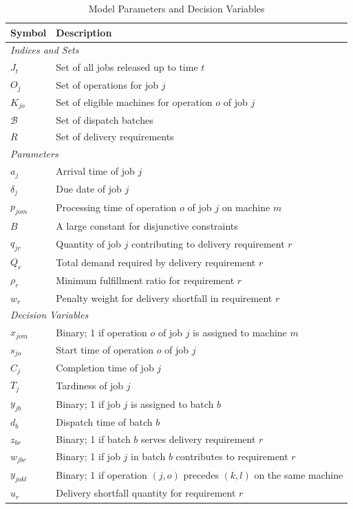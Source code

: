\documentclass{article}
\begin{document}
\vspace{-0.5\baselineskip}
\begin{table}[H]
\caption{Model Parameters and Decision Variables}
\begin{tabularx}{\textwidth}{lX}
\toprule
\textbf{Symbol} & \textbf{Description} \\
\midrule
\multicolumn{2}{l}{\textit{Indices and Sets}} \\
$J_t$ & Set of all jobs released up to time $t$ \\
$O_j$ & Set of operations for job $j$ \\
$K_{jo}$ & Set of eligible machines for operation $o$ of job $j$ \\
$\mathcal{B}$ & Set of dispatch batches \\
$R$ & Set of delivery requirements \\
\midrule
\multicolumn{2}{l}{\textit{Parameters}} \\
$a_j$ & Arrival time of job $j$ \\
$\delta_j$ & Due date of job $j$ \\
$p_{jom}$ & Processing time of operation $o$ of job $j$ on machine $m$ \\
$B$ & A large constant for disjunctive constraints \\
$q_{jr}$ & Quantity of job $j$ contributing to delivery requirement $r$ \\
$Q_r$ & Total demand required by delivery requirement $r$ \\
$\rho_r$ & Minimum fulfillment ratio for requirement $r$ \\
$w_r$ & Penalty weight for delivery shortfall in requirement $r$ \\
\midrule
\multicolumn{2}{l}{\textit{Decision Variables}} \\
$x_{jom}$ & Binary; 1 if operation $o$ of job $j$ is assigned to machine $m$ \\
$s_{jo}$ & Start time of operation $o$ of job $j$ \\
$C_j$ & Completion time of job $j$ \\
$T_j$ & Tardiness of job $j$ \\
$y_{jb}$ & Binary; 1 if job $j$ is assigned to batch $b$ \\
$d_b$ & Dispatch time of batch $b$ \\
$z_{br}$ & Binary; 1 if batch $b$ serves delivery requirement $r$ \\
$w_{jbr}$ & Binary; 1 if job $j$ in batch $b$ contributes to requirement $r$ \\
$y_{jokl}$ & Binary; 1 if operation $(j,o)$ precedes $(k,l)$ on the same machine \\
$u_r$ & Delivery shortfall quantity for requirement $r$ \\
\bottomrule
\end{tabularx}
\label{tab:variables_parameters}
\end{table}
\vspace{-0.5\baselineskip}
\end{document}
